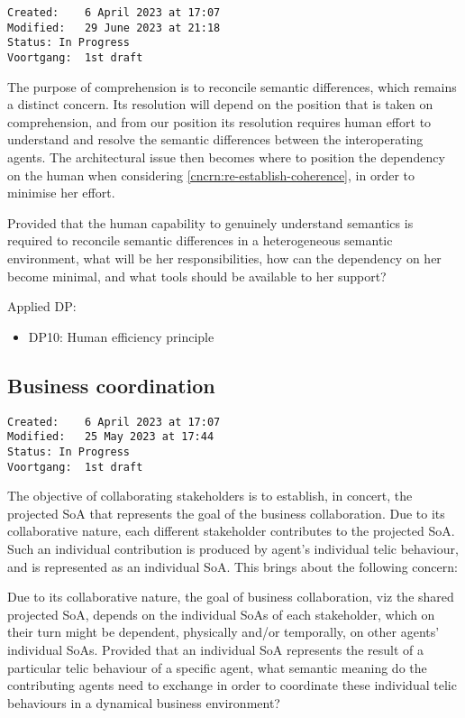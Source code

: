 \documentclass[sort&compress,preprint,3p,authoryear,twocolumn]{elsarticle}
\providecommand{\tightlist}{%
  \setlength{\itemsep}{0pt}\setlength{\parskip}{0pt}}
\theoremstyle{break}			%
\begin{document}
\begin{verbatim}
Created:    6 April 2023 at 17:07
Modified:   29 June 2023 at 21:18
Status: In Progress
Voortgang:  1st draft
\end{verbatim}

The purpose of comprehension is to reconcile semantic differences, which
remains a distinct concern. Its resolution will depend on the position
that is taken on comprehension, and from our position its resolution
requires human effort to understand and resolve the semantic differences
between the interoperating agents. The architectural issue then becomes
where to position the dependency on the human when considering
\cref{cncrn:re-establish-coherence}, in order to minimise her effort.

\begin{mmconcern}\label{cncrn:hic}
Provided that the human capability to genuinely understand semantics is required to reconcile semantic differences in a heterogeneous semantic environment, what will be her responsibilities, how can the dependency on her become minimal, and what tools should be available to her support?
\end{mmconcern}

Applied DP:

\begin{itemize}
\tightlist
\item
  DP10: Human efficiency principle
\end{itemize}

\subsection{Business coordination}\label{business-coordination}

\begin{verbatim}
Created:    6 April 2023 at 17:07
Modified:   25 May 2023 at 17:44
Status: In Progress
Voortgang:  1st draft
\end{verbatim}

The objective of collaborating stakeholders is to establish, in concert,
the projected SoA that represents the goal of the business
collaboration. Due to its collaborative nature, each different
stakeholder contributes to the projected SoA. Such an individual
contribution is produced by agent's individual telic behaviour, and is
represented as an individual SoA. This brings about the following
concern:

\begin{mmconcern}\label{cncrn:bcc}
Due to its collaborative nature, the goal of business collaboration, viz the shared projected SoA, depends on the individual SoAs of each stakeholder, which on their turn might be dependent, physically and/or temporally, on other agents’ individual SoAs. Provided that an individual SoA represents the result of a particular telic behaviour of a specific agent, what semantic meaning do the contributing agents need to exchange in order to coordinate these individual telic behaviours in a dynamical business environment?
\end{mmconcern}
\end{document}
